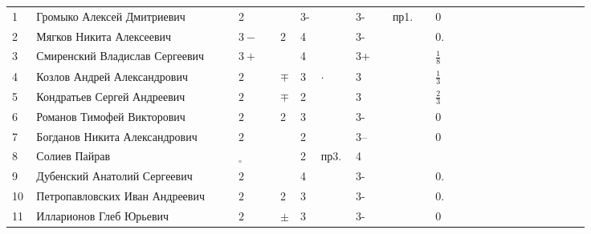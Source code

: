 \documentclass[a4paper,11pt]{article}
\newcommand*\OK{&\small \ding{51}$\!\!_\circ$} %
\newcommand*\ok{&{\small \ding{51}}} %
\newcommand*\no{&{\small }} %
\newcommand\PM{&$\pm$}
\newcommand\MP{&$\mp$}
\begin{document}
\begin{tabular}{p{7pt}|l|p{6pt}p{6pt}p{6pt}p{6pt}p{6pt}p{6pt}p{16pt}p{6pt}p{6pt}p{16pt}p{6pt}p{6pt}p{6pt}p{6pt}p{6pt}p{6pt}p{6pt}p{6pt}p{6pt}p{6pt}p{6pt}p{6pt}p{6pt}p{6pt}}
\\
\midrule
		1\,&Громыко Алексей Дмитриевич	     \ok\ok&2   \ok\no&3-\no     &3- \ok&пр1.\ok&0           & \\
		2\,&Мягков Никита Алексеевич         \ok\ok&$3-$\ok&2  &4\no     &3- \ok\no  \ok&0.          & \\		
		3\,&Смиренский Владислав Сергеевич   \ok\ok&$3+$\ok\no &4\no     &3+ \ok\ok  \ok&$\frac{1}{8}$& \\
		4\,&Козлов Андрей Александрович      \ok\ok&$2$ \ok\MP &3&$\cdot$&3  \ok\ok  \no&$\frac{1}{3}$& \\
		5\,&Кондратьев Сергей Андреевич      \ok\ok&$2$ \ok\MP &2\no     &3  \ok\ok  \ok&$\frac{2}{3}$& \\
		6\,&Романов Тимофей Викторович       \ok\ok&$2$ \ok&2  &3\no     &3- \ok\ok  \ok&0            & \\
		7\,&Богданов Никита Александрович    \ok\no&$2$ \ok\no &2\no     &3--\ok\ok  \ok&0            & \\
		8\,&Солиев Пайрав                    \ok\ok\OK  \no\ok &2&пр3.$\;$&4 \ok\ok  \ok\no           & \\
		9\,&Дубенский Анатолий Сергеевич     \ok\ok&$2$ \ok\no &4\no     &3- \ok\ok  \ok&0.           & \\
\midrule
		10\,&Петропавловских Иван Андреевич  \ok\ok&$2$ \ok&2  &3\no     &3- \ok\ok  \ok&0.           & \\
		11\,&Илларионов Глеб Юрьевич         \ok\ok&$2$ \ok\PM &3\no     &3- \ok\ok  \ok&0            & \\
\bottomrule
\end{tabular} 
\end{document}

